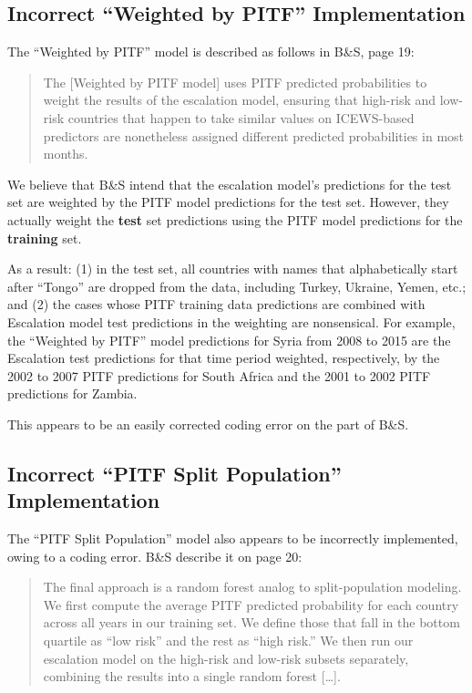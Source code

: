 \documentclass[
]{article}
\begin{document}
\hypertarget{incorrect-weighted-by-pitf-implementation}{%
\subsection{Incorrect ``Weighted by PITF'' Implementation}\label{incorrect-weighted-by-pitf-implementation}}

The ``Weighted by PITF'' model is described as follows in B\&S, page 19:

\begin{quote}
The {[}Weighted by PITF model{]} uses PITF predicted probabilities to weight the results of the escalation model, ensuring that high-risk and low-risk countries that happen to take similar values on ICEWS-based predictors are nonetheless assigned different predicted probabilities in most months.
\end{quote}

We believe that B\&S intend that the escalation model's predictions for the test set are weighted by the PITF model predictions for the test set. However, they actually weight the \textbf{test} set predictions using the PITF model predictions for the \textbf{training} set.

As a result: (1) in the test set, all countries with names that alphabetically start after ``Tongo'' are dropped from the data, including Turkey, Ukraine, Yemen, etc.; and (2) the cases whose PITF training data predictions are combined with Escalation model test predictions in the weighting are nonsensical. For example, the ``Weighted by PITF'' model predictions for Syria from 2008 to 2015 are the Escalation test predictions for that time period weighted, respectively, by the 2002 to 2007 PITF predictions for South Africa and the 2001 to 2002 PITF predictions for Zambia.

This appears to be an easily corrected coding error on the part of B\&S.

\hypertarget{incorrect-pitf-split-population-implementation}{%
\subsection{Incorrect ``PITF Split Population'' Implementation}\label{incorrect-pitf-split-population-implementation}}

The ``PITF Split Population'' model also appears to be incorrectly implemented, owing to a coding error. B\&S describe it on page 20:

\begin{quote}
The final approach is a random forest analog to split-population modeling. We first compute the average PITF predicted probability for each country across all years in our training set. We define those that fall in the bottom quartile as ``low risk'' and the rest as ``high risk.'' We then run our escalation model on the high-risk and low-risk subsets separately, combining the results into a single random forest {[}\ldots{]}.
\end{quote}
\end{document}
